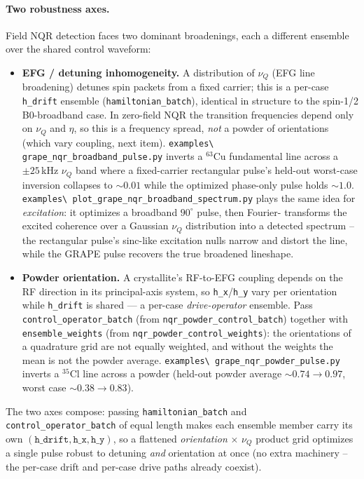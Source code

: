 \documentclass[11pt,oneside]{report}
\newcommand{\code}[1]{\texttt{#1}}
\begin{document}
\paragraph{Two robustness axes.} Field NQR detection faces two dominant
broadenings, each a different ensemble over the shared control waveform:
\begin{itemize}
  \item \textbf{EFG / detuning inhomogeneity.} A distribution of \(\nu_Q\)
  (EFG line broadening) detunes spin packets from a fixed carrier; this is a
  per-case \code{h\_drift} ensemble (\code{hamiltonian\_batch}), identical in
  structure to the spin-1/2 B0-broadband case. In zero-field NQR the transition
  frequencies depend only on \(\nu_Q\) and \(\eta\), so this is a frequency
  spread, \emph{not} a powder of orientations (which vary coupling, next item).
  \code{examples\textbackslash
  grape\_nqr\_broadband\_pulse.py} inverts a \(^{63}\)Cu fundamental line across
  a \(\pm 25\)\,kHz \(\nu_Q\) band where a fixed-carrier rectangular pulse's
  held-out worst-case inversion collapses to \(\sim 0.01\) while the optimized
  phase-only pulse holds \(\sim 1.0\). \code{examples\textbackslash
  plot\_grape\_nqr\_broadband\_spectrum.py} plays the same idea for
  \emph{excitation}: it optimizes a broadband \(90^\circ\) pulse, then Fourier-
  transforms the excited coherence over a Gaussian \(\nu_Q\) distribution into a
  detected spectrum -- the rectangular pulse's sinc-like excitation nulls narrow
  and distort the line, while the GRAPE pulse recovers the true broadened
  lineshape.
  \item \textbf{Powder orientation.} A crystallite's RF-to-EFG coupling depends
  on the RF direction in its principal-axis system, so \code{h\_x}/\code{h\_y}
  vary per orientation while \code{h\_drift} is shared --- a per-case
  \emph{drive-operator} ensemble. Pass \code{control\_operator\_batch}
  (from \code{nqr\_powder\_control\_batch}) together with
  \code{ensemble\_weights} (from \code{nqr\_powder\_control\_weights}): the
  orientations of a quadrature grid are not equally weighted, and without the
  weights the mean is not the powder average. \code{examples\textbackslash
  grape\_nqr\_powder\_pulse.py} inverts a \(^{35}\)Cl line across a powder
  (held-out powder average \(\sim 0.74 \to 0.97\), worst case
  \(\sim 0.38 \to 0.83\)).
\end{itemize}

The two axes compose: passing \code{hamiltonian\_batch} and
\code{control\_operator\_batch} of equal length makes each ensemble member carry
its own \((\code{h\_drift}, \code{h\_x}, \code{h\_y})\), so a flattened
\emph{orientation} \(\times\) \(\nu_Q\) product grid optimizes a single pulse
robust to detuning \emph{and} orientation at once (no extra machinery -- the
per-case drift and per-case drive paths already coexist).
\end{document}
